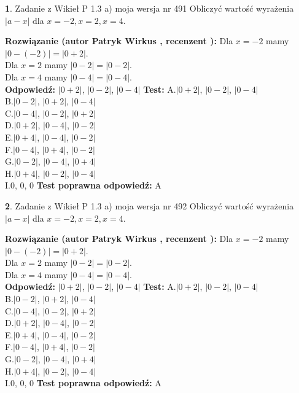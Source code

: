 \documentclass[12pt, a4paper]{article}
\theoremstyle{definition} %
\newtheorem{zad}{}
\newcommand{\zadStart}[1]{\begin{zad}#1\newline}
\newcommand{\zadStop}{\end{zad}}
\newcommand{\rozwStart}[2]{\noindent \textbf{Rozwiązanie (autor #1 , recenzent #2): }\newline}
\newcommand{\rozwStop}{\newline}
\newcommand{\odpStart}{\noindent \textbf{Odpowiedź:}\newline}
\newcommand{\odpStop}{\newline}
\newcommand{\testStart}{\noindent \textbf{Test:}\newline}
\newcommand{\testStop}{\newline}
\newcommand{\kluczStart}{\noindent \textbf{Test poprawna odpowiedź:}\newline}
\newcommand{\kluczStop}{\newline}
\begin{document}
\zadStart{Zadanie z Wikieł P 1.3 a) moja wersja nr 491}
Obliczyć wartość wyrażenia $|a - x|$ dla $x=-2,x=2,x=4$.
\zadStop
\rozwStart{Patryk Wirkus}{}
Dla $x = -2$ mamy $|0 - (-2)| = |0 + 2|$.\\
Dla $x = 2$ mamy $|0 - 2| = |0 - 2|$.\\
Dla $x = 4$ mamy $|0 - 4| = |0 - 4|$.\\
\rozwStop
\odpStart
$|0 + 2|$, $|0 - 2|$, $|0 - 4|$
\odpStop
\testStart
A.$|0 + 2|$, $|0 - 2|$, $|0 - 4|$\\
B.$|0 - 2|$, $|0 + 2|$, $|0 - 4|$\\
C.$|0 - 4|$, $|0 - 2|$, $|0 + 2|$\\
D.$|0 + 2|$, $|0 - 4|$, $|0 - 2|$\\
E.$|0 + 4|$, $|0 - 4|$, $|0 - 2|$\\
F.$|0 - 4|$, $|0 + 4|$, $|0 - 2|$\\
G.$|0 - 2|$, $|0 - 4|$, $|0 + 4|$\\
H.$|0 + 4|$, $|0 - 2|$, $|0 - 4|$\\
I.$0$, $0$, $0$
\testStop
\kluczStart
A
\kluczStop



\zadStart{Zadanie z Wikieł P 1.3 a) moja wersja nr 492}
Obliczyć wartość wyrażenia $|a - x|$ dla $x=-2,x=2,x=4$.
\zadStop
\rozwStart{Patryk Wirkus}{}
Dla $x = -2$ mamy $|0 - (-2)| = |0 + 2|$.\\
Dla $x = 2$ mamy $|0 - 2| = |0 - 2|$.\\
Dla $x = 4$ mamy $|0 - 4| = |0 - 4|$.\\
\rozwStop
\odpStart
$|0 + 2|$, $|0 - 2|$, $|0 - 4|$
\odpStop
\testStart
A.$|0 + 2|$, $|0 - 2|$, $|0 - 4|$\\
B.$|0 - 2|$, $|0 + 2|$, $|0 - 4|$\\
C.$|0 - 4|$, $|0 - 2|$, $|0 + 2|$\\
D.$|0 + 2|$, $|0 - 4|$, $|0 - 2|$\\
E.$|0 + 4|$, $|0 - 4|$, $|0 - 2|$\\
F.$|0 - 4|$, $|0 + 4|$, $|0 - 2|$\\
G.$|0 - 2|$, $|0 - 4|$, $|0 + 4|$\\
H.$|0 + 4|$, $|0 - 2|$, $|0 - 4|$\\
I.$0$, $0$, $0$
\testStop
\kluczStart
A
\kluczStop
\end{document}
